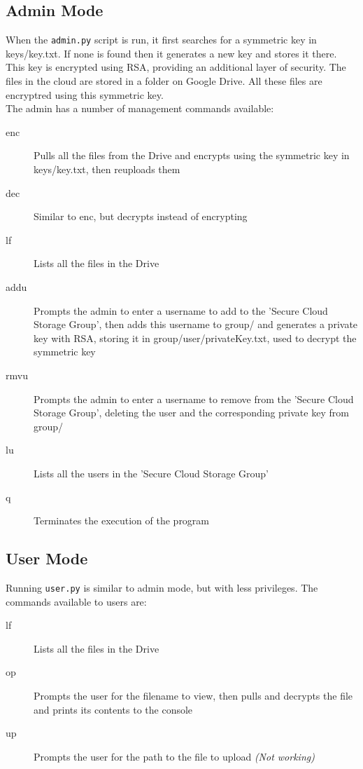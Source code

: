 \documentclass{article}
\begin{document}
	\subsection{Admin Mode}
		When the \texttt{admin.py} script is run, it first searches for a symmetric key in keys/key.txt. If none is found then it generates a new key and stores it there. This key is encrypted using RSA, providing an additional layer of security. The files in the cloud are stored in a folder on Google Drive. All these files are encryptred using this symmetric key. \\
		The admin has a number of management commands available:
		\begin{description}
			\item[enc]
				Pulls all the files from the Drive and encrypts using the symmetric key in keys/key.txt, then reuploads them
			\item[dec]
				Similar to enc, but decrypts instead of encrypting
			\item[lf]
				Lists all the files in the Drive
			\item[addu]
				Prompts the admin to enter a username to add to the 'Secure Cloud Storage Group', then adds this username to group/ and generates a private key with RSA, storing it in group/user/privateKey.txt, used to decrypt the symmetric key
			\item[rmvu]
				Prompts the admin to enter a username to remove from the 'Secure Cloud Storage Group', deleting the user and the corresponding private key from group/
			\item[lu]
				Lists all the users in the 'Secure Cloud Storage Group'
			\item[q]
				Terminates the execution of the program
		\end{description}
	\subsection{User Mode}
		Running \texttt{user.py} is similar to admin mode, but with less privileges. The commands available to users are:
		\begin{description}
			\item[lf]
				Lists all the files in the Drive
			\item[op]
				Prompts the user for the filename to view, then pulls and decrypts the file and prints its contents to the console
			\item[up]
				Prompts the user for the path to the file to upload \emph{(Not working)}
		\end{description}
\end{document}
